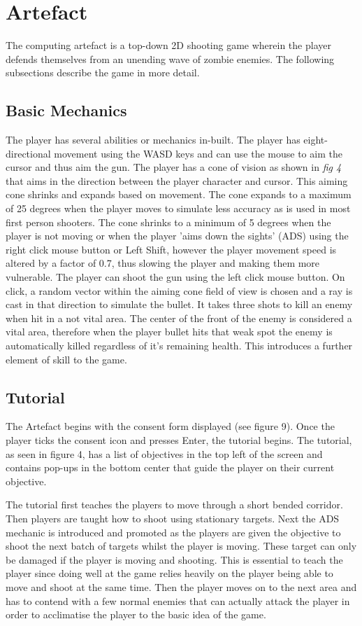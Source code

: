 \documentclass[journal]{IEEEtran}
\begin{document}
\section{Artefact}
The computing artefact is a top-down 2D shooting game wherein the player defends themselves from an unending wave of zombie enemies. The following subsections describe the game in more detail.

\subsection{Basic Mechanics}
 The player has several abilities or mechanics in-built. The player has eight-directional movement using the WASD keys and can use the mouse to aim the cursor and thus aim the gun. 
The player has a cone of vision as shown in \textit{fig 4} that aims in the direction between the player character and cursor. This aiming cone shrinks and expands based on movement. The cone expands to a maximum of 25 degrees when the player moves to simulate less accuracy as is used in most first person shooters. The cone shrinks to a minimum of 5 degrees when the player is not moving or when the player 'aims down the sights' (ADS) using the right click mouse button or Left Shift, however the player movement speed is altered by a factor of 0.7, thus slowing the player and making them more vulnerable. 
The player can shoot the gun using the left click mouse button. On click, a random vector within the aiming cone field of view is chosen and a ray is cast in that direction to simulate the bullet. It takes three shots to kill an enemy when hit in a not vital area. The center of the front of the enemy is considered a vital area, therefore when the player bullet hits that weak spot the enemy is automatically killed regardless of it's remaining health. This introduces a further element of skill to the game.

\subsection{Tutorial}
The Artefact begins with the consent form displayed (see figure 9). Once the player ticks the consent icon and presses Enter, the tutorial begins. The tutorial, as seen in figure 4, has a list of objectives in the top left of the screen and contains pop-ups in the bottom center that guide the player on their current objective. 

The tutorial first teaches the players to move through a short bended corridor. Then players are taught how to shoot using stationary targets. Next the ADS mechanic is introduced and promoted as the players are given the objective to shoot the next batch of targets whilst the player is moving. These target can only be damaged if the player is moving and shooting. This is essential to teach the player since doing well at the game relies heavily on the player being able to move and shoot at the same time. Then the player moves on to the next area and has to contend with a few normal enemies that can actually attack the player in order to acclimatise the player to the basic idea of the game.
\end{document}
